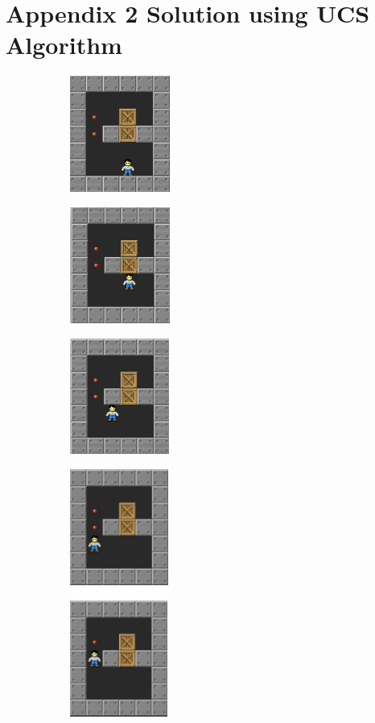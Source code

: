 \documentclass[10pt, final]{article}
\begin{document}
	\section{Appendix 2 Solution using UCS Algorithm}
		\begin{figure}[h!]
		{
			\begin{subfigure}[h!]{1.3in}
				\includegraphics[height=1.5in]{p1.png}
			\end{subfigure}
			\begin{subfigure}[h!]{1.3in}
				\includegraphics[height=1.5in]{p2.png}
			\end{subfigure}
			\begin{subfigure}[h!]{1.3in}
				\includegraphics[height=1.5in]{p3.png}
		\end{subfigure}
	\begin{subfigure}[h!]{1.3in}
		\includegraphics[height=1.5in]{p4.png}
\end{subfigure}
\begin{subfigure}[h!]{1.3in}
	\includegraphics[height=1.5in]{p5.png}
\end{subfigure}}
		\label{fig:chain}
	\end{figure}
\end{document}
